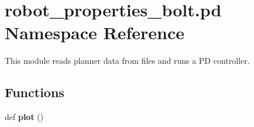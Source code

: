 \hypertarget{namespacerobot__properties__bolt_1_1pd}{}\section{robot\+\_\+properties\+\_\+bolt.\+pd Namespace Reference}
\label{namespacerobot__properties__bolt_1_1pd}


This module reads planner data from files and runs a PD controller.  


\subsection*{Functions}
\begin{DoxyCompactItemize}
\item 
\mbox{\label{namespacerobot__properties__bolt_1_1pd_aefad3d3447a097bbda79da022146dc01}} 
def {\bfseries plot} ()
\end{DoxyCompactItemize}
